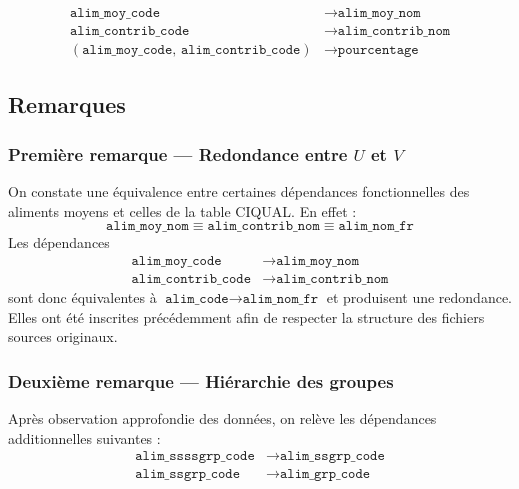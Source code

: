 \documentclass[12pt, a4paper]{article}
\newcommand{\attr}[1]{\texttt{#1}}
\begin{document}
    \begin{align*}
        \attr{alim\_moy\_code}    &\rightarrow \attr{alim\_moy\_nom} \\
        \attr{alim\_contrib\_code}&\rightarrow \attr{alim\_contrib\_nom} \\
        (\attr{alim\_moy\_code},\, \attr{alim\_contrib\_code}) &\rightarrow \attr{pourcentage}
    \end{align*}


    \subsection{Remarques}
    \label{sec:remarques}

    \subsubsection*{Première remarque --- Redondance entre \texorpdfstring{$U$}{U} et \texorpdfstring{$V$}{V}}
    \label{sec:remarque1}

    On constate une équivalence entre certaines dépendances fonctionnelles des aliments moyens et celles
    de la table CIQUAL. En effet :
    \[
        \attr{alim\_moy\_nom} \equiv \attr{alim\_contrib\_nom} \equiv \attr{alim\_nom\_fr}
    \]
    Les dépendances
    \begin{align*}
        \attr{alim\_moy\_code}    &\rightarrow \attr{alim\_moy\_nom} \\
        \attr{alim\_contrib\_code}&\rightarrow \attr{alim\_contrib\_nom}
    \end{align*}
    sont donc équivalentes à $\attr{alim\_code} \rightarrow \attr{alim\_nom\_fr}$ et produisent une
    redondance. Elles ont été inscrites précédemment afin de respecter la structure des fichiers sources
    originaux.

    \subsubsection*{Deuxième remarque --- Hiérarchie des groupes}
    \label{sec:remarque2}

    Après observation approfondie des données, on relève les dépendances additionnelles suivantes :
    \begin{align*}
        \attr{alim\_ssssgrp\_code} &\rightarrow \attr{alim\_ssgrp\_code} \\
        \attr{alim\_ssgrp\_code}   &\rightarrow \attr{alim\_grp\_code}
    \end{align*}
\end{document}
